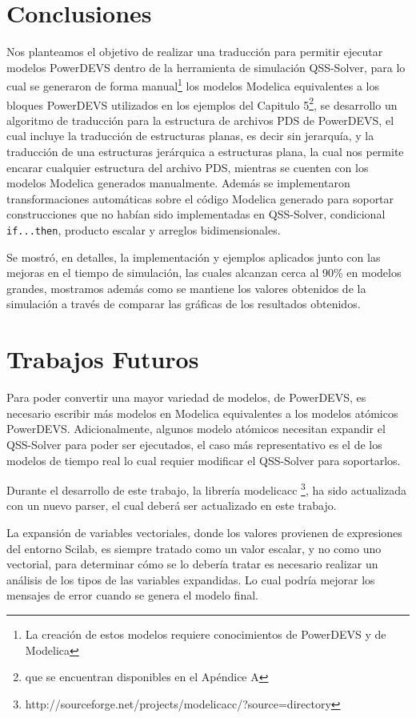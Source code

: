 
\section{Conclusiones}

	Nos planteamos el objetivo de realizar una traducción para permitir ejecutar modelos PowerDEVS dentro de la herramienta de simulación QSS-Solver, 
	para lo cual se generaron de forma manual\footnote{La creación de estos modelos requiere conocimientos de PowerDEVS y de Modelica} los modelos 
	Modelica equivalentes a los bloques PowerDEVS utilizados en los ejemplos del Capitulo 5\footnote{que se encuentran disponibles en el Apéndice A},
        se desarrollo un algoritmo de traducción para la estructura de archivos PDS de PowerDEVS, el cual incluye la traducción de estructuras planas,
	 es decir sin jerarquía, y la traducción de una estructuras jerárquica a estructuras plana, la cual nos permite encarar cualquier estructura 
	del archivo PDS, mientras se cuenten con los modelos Modelica generados manualmente. Además se implementaron transformaciones automáticas 
	sobre el código Modelica generado para soportar construcciones que no habían sido implementadas en QSS-Solver, condicional \texttt{if...then}, 
	producto escalar y arreglos bidimensionales.

	Se mostró, en detalles, la implementación y ejemplos aplicados junto con las mejoras en el tiempo de simulación, las cuales alcanzan cerca al 90\%
	 en modelos grandes, mostramos además como se mantiene los valores obtenidos de la simulación a través de comparar las gráficas de los resultados obtenidos.

\section{Trabajos Futuros}
	Para poder convertir una mayor variedad de modelos, de PowerDEVS, es necesario escribir más modelos en Modelica equivalentes a los modelos atómicos PowerDEVS.
	Adicionalmente, algunos modelo atómicos necesitan expandir el QSS-Solver para poder ser ejecutados, el caso más representativo es el de los modelos de tiempo
	 real lo cual requier modificar el QSS-Solver para soportarlos.

	Durante el desarrollo de este trabajo, la librería modelicacc \footnote{http://sourceforge.net/projects/modelicacc/?source=directory}, ha sido actualizada 
	con un nuevo parser, el cual deberá ser actualizado en este trabajo.

	La expansión de variables vectoriales, donde los valores provienen de expresiones del entorno Scilab, es siempre tratado como un valor escalar, y no como 
	uno vectorial, para determinar cómo se lo debería tratar es necesario realizar un análisis de los tipos de las variables expandidas. 
	Lo cual podría mejorar los mensajes de error cuando se genera el modelo final.

